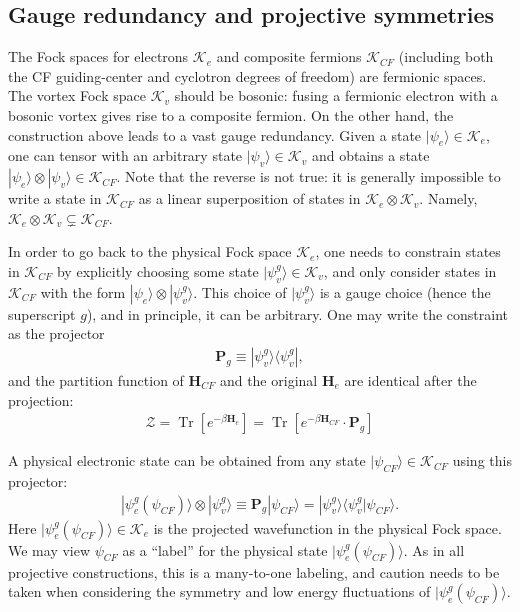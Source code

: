 \subsection{Gauge redundancy and projective symmetries}
The Fock spaces for electrons $\mathcal K_e$ and composite fermions $\mathcal K_{CF}$ (including both the CF guiding-center and cyclotron degrees of freedom) are fermionic spaces. The vortex Fock space $\mathcal K_v$ should be bosonic: fusing a fermionic electron with a bosonic vortex gives rise to a composite fermion. On the other hand, the construction above leads to a vast gauge redundancy. Given a state $|\psi_e\rangle\in \mathcal K_e$, one can tensor with an arbitrary state $|\psi_v\rangle\in \mathcal K_v$ and obtains a state $|\psi_e\rangle\otimes|\psi_v\rangle \in \mathcal K_{CF}$. Note that the reverse is not true: it is generally impossible to write a state in $\mathcal K_{CF}$ as a linear superposition of states in $\mathcal K_e\otimes \mathcal K_v$. Namely, $\mathcal K_e\otimes \mathcal K_v\subsetneq \mathcal K_{CF}$.

In order to go back to the physical Fock space $\mathcal K_e$, one needs to constrain states in $\mathcal K_{CF}$ by explicitly choosing some state $|\psi_v^g\rangle\in \mathcal K_v$, and only consider states in $\mathcal K_{CF}$ with the form $|\psi_e\rangle\otimes |\psi_v^g\rangle$. This choice of $|\psi_v^g\rangle$ is a gauge choice (hence the superscript $g$), and in principle, it can be arbitrary. One may write the constraint as the projector
\begin{align}
    \mathbf P_g\equiv |\psi_v^g\rangle\langle\psi_v^g|,
\end{align}
and the partition function of $\mathbf H_{CF}$ and the original $\mathbf H_e$ are identical after the projection:
\begin{align}
    \mathcal Z=\mathop{\mathrm{Tr}}[e^{-\beta \mathbf H_e}]=\mathop{\mathrm{Tr}}[ e^{-\beta \mathbf H_{CF}} \cdot \mathbf P_g]\label{eq:full_constraint}
\end{align}

A physical electronic state can be obtained from any state $|\psi_{CF}\rangle\in\mathcal K_{CF}$ using this projector:
\begin{align}
    |\psi^g_e(\psi_{CF})\rangle\otimes|\psi_v^g\rangle\equiv \mathbf P_g |\psi_{CF}\rangle =|\psi_v^g\rangle\langle\psi_v^g|\psi_{CF}\rangle.\label{eq:projection_ket}
\end{align}
Here $|\psi^g_e(\psi_{CF})\rangle\in \mathcal K_e$ is the projected wavefunction in the physical Fock space. We may view $\psi_{CF}$ as a ``label'' for the physical state $|\psi^g_e(\psi_{CF})\rangle$. As in all projective constructions, this is a many-to-one labeling, and caution needs to be taken when considering the symmetry and low energy fluctuations of $|\psi^g_e(\psi_{CF})\rangle$.

